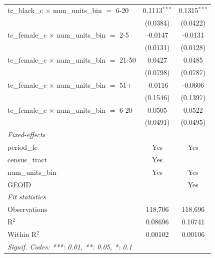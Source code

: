 \begin{tabular}{lcc}
   tc\_black\_c $\times$ num\_units\_bin $=$ 6-20        & 0.1113$^{***}$  & 0.1315$^{***}$\\   
                                                         & (0.0384)        & (0.0422)\\   
   tc\_female\_c $\times$ num\_units\_bin $=$ 2-5        & -0.0147         & -0.0131\\   
                                                         & (0.0131)        & (0.0128)\\   
   tc\_female\_c $\times$ num\_units\_bin $=$ 21-50      & 0.0427          & 0.0485\\   
                                                         & (0.0798)        & (0.0787)\\   
   tc\_female\_c $\times$ num\_units\_bin $=$ 51+        & -0.0116         & -0.0606\\   
                                                         & (0.1546)        & (0.1397)\\   
   tc\_female\_c $\times$ num\_units\_bin $=$ 6-20       & 0.0505          & 0.0522\\   
                                                         & (0.0491)        & (0.0495)\\   
   \midrule
   \emph{Fixed-effects}\\
   period\_fe                                            & Yes             & Yes\\  
   census\_tract                                         & Yes             & \\  
   num\_units\_bin                                       & Yes             & Yes\\  
   GEOID                                                 &                 & Yes\\  
   \midrule
   \emph{Fit statistics}\\
   Observations                                          & 118,706         & 118,696\\  
   R$^2$                                                 & 0.08696         & 0.10741\\  
   Within R$^2$                                          & 0.00102         & 0.00106\\  
   \midrule \midrule
   \multicolumn{3}{l}{\emph{Signif. Codes: ***: 0.01, **: 0.05, *: 0.1}}\\
\end{tabular}
\par\endgroup
